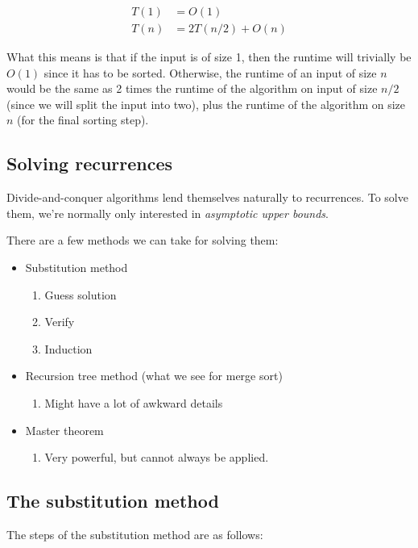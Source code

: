 \documentclass[11pt,a4paper,titlepage,dvipsnames,cmyk]{scrartcl}
\begin{document}
\begin{align*}
    T(1) &= O(1) \\
    T(n) &= 2T(n/2) + O(n)
\end{align*}

What this means is that if the input is of size 1, then the runtime will
trivially be $O(1)$ since it has to be sorted. Otherwise, the runtime of
an input of size $n$ would be the same as 2 times the runtime of the
algorithm on input of size $n/2$ (since we will split the input into two),
plus the runtime of the algorithm on size $n$ (for the final sorting
step).

\subsection{Solving recurrences}%
\label{sub:Solving recurrences}
Divide-and-conquer algorithms lend themselves naturally to recurrences. To
solve them, we're normally only interested in \textit{asymptotic upper
bounds}.

There are a few methods we can take for solving them:

\begin{itemize}
    \item Substitution method
        \begin{enumerate}
            \item Guess solution
            \item Verify
            \item Induction
        \end{enumerate}
    \item Recursion tree method (what we see for merge sort)
        \begin{enumerate}
            \item Might have a lot of awkward details
        \end{enumerate}
    \item Master theorem
        \begin{enumerate}
            \item Very powerful, but cannot always be applied.
        \end{enumerate}
\end{itemize}

\subsection{The substitution method}%
\label{sub:The substitution method}
The steps of the substitution method are as follows:
\end{document}
